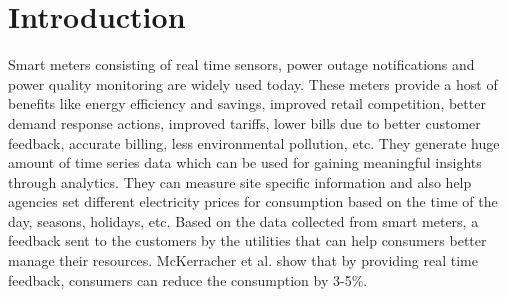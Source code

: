 \documentclass[runningheads,a4paper]{llncs}
\begin{document}
\section{Introduction}

Smart meters consisting of real time sensors, power outage notifications and power quality monitoring are widely used today. These meters provide a host of benefits like energy efficiency and savings, improved retail competition, better demand response actions, improved tariffs, lower bills due to better customer feedback, accurate billing, less environmental pollution, etc. \cite{Klopfert}
They generate huge amount of time series data which can be used for gaining meaningful insights through analytics.
They can measure site specific information and also help agencies set different electricity prices for consumption based on the time of the day, seasons, holidays, etc. Based on the data collected from smart meters, a feedback sent to the customers by the utilities that can help consumers better manage their resources. McKerracher et al. \cite{mckerracher} show that by providing real time feedback, consumers can reduce the consumption by 3-5\%.
\end{document}
